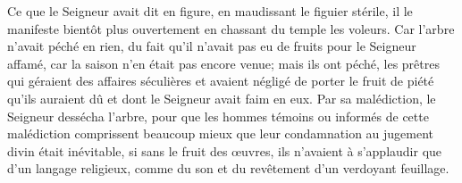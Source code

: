 Ce que le Seigneur avait dit en figure, en maudissant le figuier stérile,
	il le manifeste bientôt plus ouvertement
	en chassant du temple les voleurs.
Car l’arbre n’avait péché en rien,
	du fait qu’il n’avait pas eu de fruits pour le Seigneur affamé,
	car la saison n’en était pas encore venue;
	mais ils ont péché, les prêtres qui géraient des affaires séculières
	et avaient négligé de porter le fruit de piété qu’ils auraient dû
	et dont le Seigneur avait faim en eux.
Par sa malédiction, le Seigneur dessécha l’arbre,
	pour que les hommes témoins ou informés de cette malédiction
	comprissent beaucoup mieux
		que leur condamnation au jugement divin était inévitable,
	si sans le fruit des œuvres,
		ils n’avaient à s’applaudir que d’un langage religieux,
	comme du son et du revêtement d’un verdoyant feuillage.
